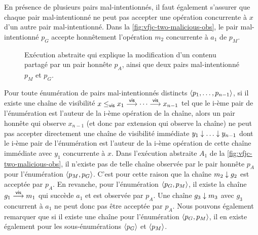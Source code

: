 En présence de plusieurs pairs mal-intentionnés, il faut également s'assurer que chaque pair mal-intentionné ne peut pas accepter une opération concurrente à $x$ d'un autre pair mal-intentionné.
Dans la \autoref{fig:vfjc-two-malicious-obs}, le pair mal-intentionné $p_G$ accepte honnêtement l'opération $m_2$ concurrente à $a_1$ de $p_M$.

\begin{figure}[htb]
\centering
{}
\caption{Exécution abstraite qui explique la modification d'un contenu partagé par un pair honnête $p_A$, ainsi que deux pairs mal-intentionné $p_M$ et $p_G$.}\label{fig:vfjc-two-malicious-obs}
\end{figure}

Pour toute énumération de pairs mal-intentionnés distincts $\tuple*{p_1, \dotsc ,p_{n-1}}$, si il existe une chaîne de visibilité $x \viseq x_1 \vis \dotsb \vis x_{n-1}$ tel que le i-ème pair de l'énumération est l'auteur de la i-ème opération de la chaîne, alors un pair honnête qui observe $x_{n-1}$ (et donc par extension qui observe la chaîne) ne peut pas accepter directement une chaîne de visibilité immédiate $y_1 \idr \dotsc \idr y_{n-1}$ dont le i-ème pair de l'énumération est l'auteur de la i-ème opération de cette chaîne immédiate avec $y_1$ concurrente à $x$.
Dans l'exécution abstraite $A_1$ de la \autoref{fig:vfjc-two-malicious-obs}, il n'existe pas de telle chaîne observée par le pair honnête $p_A$ pour l'énumération $\tuple*{p_M, p_G}$.
C'est pour cette raison que la chaîne $m_2 \idr g_2$ est acceptée par $p_A$.
En revanche, pour l'énumération $\tuple*{p_G, p_M}$, il existe la chaîne $g_1 \vis m_1$ qui succède $a_1$ et est observée par $p_A$.
Une chaîne $g_3 \idr m_3$ avec $g_3$ concurrent à $a_1$ ne peut donc pas être acceptée par $p_A$.
Nous pouvons également remarquer que si il existe une chaîne pour l'énumération $\tuple*{p_G, p_M}$, il en existe également pour les sous-énumérations $\tuple*{p_G}$ et $\tuple*{p_M}$.

